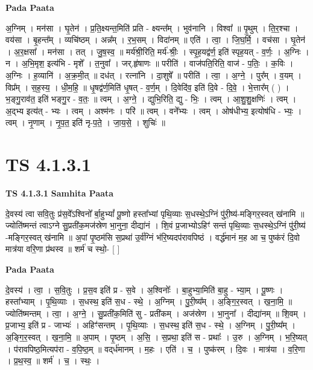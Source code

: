 \documentclass[17pt]{extarticle}
\begin{document}
\textbf{Pada Paata} \newline

अ॒ग्निम् । मन॑सा । घृ॒तेन॑ । प्र॒ति॒क्ष्यन्त॒मिति॑ प्रति - क्ष्यन्त᳚म् । भुव॑नानि । विश्वा᳚ ॥ पृ॒थुम् । ति॒र॒श्चा । वय॑सा । बृ॒हन्त᳚म् । व्यचि॑ष्ठम् । अन्न᳚म् । र॒भ॒सम् । विदा॑नम् ॥ एति॑ । त्वा॒ । जि॒घ॒र्मि॒ । वच॑सा । घृ॒तेन॑ । अ॒र॒क्षसा᳚ । मन॑सा । तत् । जु॒ष॒स्व॒ ॥ मर्य॑श्री॒रिति॒ मर्य॑-श्रीः॒ । स्पृ॒ह॒यद्व॑र्ण॒ इति॑ स्पृह॒यत् - व॒र्णः॒ । अ॒ग्निः । न । अ॒भि॒मृश॒ इत्य॑भि - मृशे᳚ । त॒नुवा᳚ । जर्.हृ॑षाणः ॥ परीति॑ । वाज॑पति॒रिति॒ वाज॑ - प॒तिः॒ । क॒विः । अ॒ग्निः । ह॒व्यानि॑ । अ॒क्र॒मी॒त् ॥ दध॑त् । रत्ना॑नि । दा॒शुषे᳚ ॥ परीति॑ । त्वा॒ । अ॒ग्ने॒ । पुर᳚म् । व॒यम् । विप्र᳚म् । स॒ह॒स्य॒ । धी॒म॒हि॒ ॥ धृ॒षद्व॑र्ण॒मिति॑ धृ॒षत् - व॒र्ण॒म् । दि॒वेदि॑व॒ इति॑ दि॒वे - दि॒वे॒ । भे॒त्तार᳚म् ( ) । भ॒ङ्गु॒राव॑त॒ इति॑ भङ्गु॒र - व॒तः॒ ॥ त्वम् । अ॒ग्ने॒ । द्युभि॒रिति॒ द्यु - भिः॒ । त्वम् । आ॒शु॒शु॒क्षणिः॑ । त्वम् । अ॒द्भ्य इत्य॑त् - भ्यः । त्वम् । अश्म॑नः । परि॑ ॥ त्वम् । वने᳚भ्यः । त्वम् । ओष॑धीभ्य॒ इत्योष॑धि - भ्यः॒ । त्वम् । नृ॒णाम् । नृ॒प॒त॒ इति॑ नृ-प॒ते॒ । जा॒य॒से॒ । शुचिः॑ ॥  \newline





\section{ TS 4.1.3.1 }

\textbf{TS 4.1.3.1 } \newline
\textbf{Samhita Paata} \newline

दे॒वस्य॑ त्वा सवि॒तुः प्र॑स॒वे᳚ऽश्विनो᳚ र्बा॒हुभ्यां᳚ पू॒ष्णो हस्ता᳚भ्यां पृथि॒व्याः स॒धस्थे॒ऽग्निं पु॑री॒ष्य॑-मङ्गिर॒स्वत् ख॑नामि ॥ ज्योति॑ष्मन्तं त्वाऽग्ने सु॒प्रती॑क॒मज॑स्रेण भा॒नुना॒ दीद्या॑नं । शि॒वं प्र॒जाभ्योऽहिꣳ॑ सन्तं पृथि॒व्याः स॒धस्थे॒ऽग्निं पु॑री॒ष्य॑ -मङ्गिर॒स्वत् ख॑नामि ॥ अ॒पां पृ॒ष्ठम॑सि स॒प्रथा॑ उ॒र्व॑ग्निं भ॑रि॒ष्यदप॑रावपिष्ठं । वर्द्ध॑मानं म॒ह आ च॒ पुष्क॑रं दि॒वो मात्र॑या वरि॒णा प्र॑थस्व ॥ शर्म॑ च स्थो॒- [  ] \newline

\textbf{Pada Paata} \newline

दे॒वस्य॑ । त्वा॒ । स॒वि॒तुः । प्र॒स॒व इति॑ प्र - स॒वे । अ॒श्विनोः᳚ । बा॒हुभ्या॒मिति॑ बा॒हु - भ्या॒म् । पू॒ष्णः । हस्ता᳚भ्याम् । पृ॒थि॒व्याः । स॒धस्थ॒ इति॑ स॒ध - स्थे॒ । अ॒ग्निम् । पु॒री॒ष्य᳚म् । अ॒ङ्गि॒र॒स्वत् । ख॒ना॒मि॒ ॥ ज्योति॑ष्मन्तम् । त्वा॒ । अ॒ग्ने॒ । सु॒प्रती॑क॒मिति॑ सु - प्रती॑कम् । अज॑स्रेण । भा॒नुना᳚ । दीद्या॑नम् ॥ शि॒वम् । प्र॒जाभ्य॒ इति॑ प्र - जाभ्यः॑ । अहिꣳ॑सन्तम् । पृ॒थि॒व्याः । स॒धस्थ॒ इति॑ स॒ध - स्थे॒ । अ॒ग्निम् । पु॒री॒ष्य᳚म् । अ॒ङ्गि॒र॒स्वत् । ख॒ना॒मि॒ ॥ अ॒पाम् । पृ॒ष्ठम् । अ॒सि॒ । स॒प्रथा॒ इति॑ स - प्रथाः᳚ । उ॒रु । अ॒ग्निम् । भ॒रि॒ष्यत् । प॑रावपिष्ठ॒मित्यप॑रा - व॒पि॒ष्ठ॒म् ॥ वद्‌र्ध॑मानम् । म॒हः । एति॑ । च॒ । पुष्क॑रम् । दि॒वः । मात्र॑या । व॒रि॒णा । प्र॒थ॒स्व॒ ॥ शर्म॑ । च॒ । स्थः॒ ।  \newline
\end{document}
